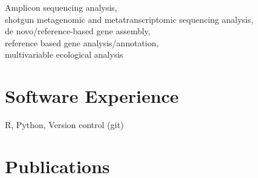 \documentclass[letterpaper,10pt]{article} %
\begin{document}
Amplicon sequencing analysis, \\
shotgun metagenomic and metatranscriptomic sequencing analysis, \\
de novo/reference-based gene assembly, \\
reference based gene analysis/annotation, \\
multivariable ecological analysis


\section{Software Experience}

R, Python, Version control (git)


\section{Publications}
\end{document}
